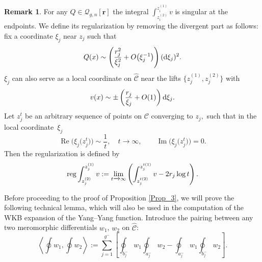 \documentclass[pdftex]{sigma}
\numberwithin{equation}{section}
\theoremstyle{definition}
\newtheorem{Remark}[Theorem]{Remark}
\begin{document}
\begin{Remark}
For any $Q \in \mathcal{Q}_{g,n}[\mathbf{r}]$ the integral $\int^{z^{(1)}_i}_{z^{(2)}_i} v$ is singular at the endpoints. We define its regularization by removing the divergent part as follows: fix a coordinate $\xi_j$ near $z_j$ such that
\begin{equation*}%
Q(x) \sim \left(\frac{r_j^2}{\xi_j^2} +O\big(\xi_j^{-1}\big)\right)({\rm d} \xi_j)^2.\end{equation*}
$\xi_j$ can also serve as a local coordinate on $\hat{\mathcal{C}}$ near the lifts $\big\{ {z^{(1)}_j}, {z^{(2)}_j}\big\}$ with
\begin{equation*}%
v(x)\sim \pm \left(\frac{ r_j}{\xi_j} +O(1)\right){\rm d} \xi_j.\end{equation*}
Let $z^t_j$ be an arbitrary sequence of points on $\mathcal{C}$ converging to $z_j,$ such that in the local coordinate~$\xi_j$
\begin{equation*}%
\operatorname{Re} \big(\xi_j\big(z^t_j\big)\big) \sim \frac{1}{t}, \quad t \xrightarrow{} \infty, \qquad \operatorname{Im} \big(\xi_j\big(z^t_j\big)\big)=0.\end{equation*}
Then the regularization is defined by
\begin{equation}\label{76}
{\rm reg}\int^{z^{(1)}_j}_{z^{(2)}_j}v := \lim_{t \xrightarrow{} \infty } \left( \int^{z^{t (1)}_j}_{z^{t (2)}_j}v - 2 r_j \log t \right).
\end{equation}
\end{Remark}
Before proceeding to the proof of Proposition \ref{Prop_3}, we will prove the following technical lemma, which will also be used in the computation of the WKB expansion of the Yang--Yang function. Introduce the pairing between any two meromorphic differentials $w_1$, $w_2$ on $\hat{\mathcal{C}}$:
\begin{equation}\label{77} \left\langle\oint w_1,\oint w_2 \right\rangle:=\sum^{g^-}_{j=1}\left[\oint_{b^-_j}w_1 \oint_{a^-_j}w_2 - \oint_{a^-_j}w_1 \oint_{b^-_j}w_2\right].\end{equation}
\end{document}

